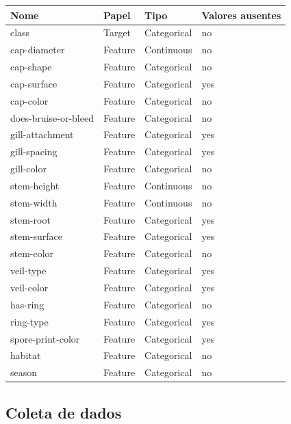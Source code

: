 \documentclass[12pt,a4paper]{article}
\begin{document}
\begin{table}[h]
	\centering
	\begin{tabular}{|l|l|l|l|}
		\hline
		\textbf{Nome} & \textbf{Papel} & \textbf{Tipo} & \textbf{ Valores ausentes} \\
		\hline
		class & Target & Categorical & no \\
		\hline
		cap-diameter & Feature & Continuous & no \\
		\hline
		cap-shape & Feature & Categorical & no \\
		\hline
		cap-surface & Feature & Categorical & yes \\
		\hline
		cap-color & Feature & Categorical & no \\
		\hline
		does-bruise-or-bleed & Feature & Categorical & no \\
		\hline
		gill-attachment & Feature & Categorical & yes \\
		\hline
		gill-spacing & Feature & Categorical & yes \\
		\hline
		gill-color & Feature & Categorical & no \\
		\hline
		stem-height & Feature & Continuous & no \\
		\hline
		stem-width & Feature & Continuous & no \\
		\hline
		stem-root & Feature & Categorical & yes \\
		\hline
		stem-surface & Feature & Categorical & yes \\
		\hline
		stem-color & Feature & Categorical & no \\
		\hline
		veil-type & Feature & Categorical & yes \\
		\hline
		veil-color & Feature & Categorical & yes \\
		\hline
		has-ring & Feature & Categorical & no \\
		\hline
		ring-type & Feature & Categorical & yes \\
		\hline
		spore-print-color & Feature & Categorical & yes \\
		\hline
		habitat & Feature & Categorical & no \\
		\hline
		season & Feature & Categorical & no \\
		\hline
	\end{tabular}
\end{table}

\subsection{Coleta de dados}
\end{document}
